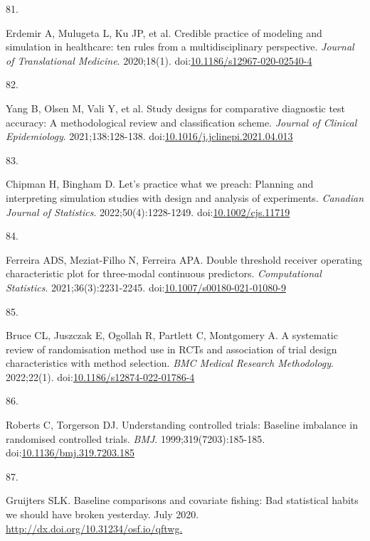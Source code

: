 \documentclass[
]{book}
\newlength{\cslhangindent}
\newlength{\csllabelwidth}
\newlength{\cslentryspacingunit} %
\newenvironment{CSLReferences}[2] %
 {%
  \setlength{\parindent}{0pt}
  \ifodd #1
  \let\oldpar\par
  \def\par{\hangindent=\cslhangindent\oldpar}
  \fi
  \setlength{\parskip}{#2\cslentryspacingunit}
 }%
 {}
\newcommand{\CSLLeftMargin}[1]{\parbox[t]{\csllabelwidth}{#1}}
\newcommand{\CSLRightInline}[1]{\parbox[t]{\linewidth - \csllabelwidth}{#1}\break}
\begin{document}
\begin{CSLReferences}{0}{0}
\leavevmode{}%
\CSLLeftMargin{81. }%
\CSLRightInline{Erdemir A, Mulugeta L, Ku JP, et al. Credible practice of modeling and simulation in healthcare: ten rules from a multidisciplinary perspective. \emph{Journal of Translational Medicine}. 2020;18(1). doi:\href{https://doi.org/10.1186/s12967-020-02540-4}{10.1186/s12967-020-02540-4}}

\leavevmode{}%
\CSLLeftMargin{82. }%
\CSLRightInline{Yang B, Olsen M, Vali Y, et al. Study designs for comparative diagnostic test accuracy: A methodological review and classification scheme. \emph{Journal of Clinical Epidemiology}. 2021;138:128-138. doi:\href{https://doi.org/10.1016/j.jclinepi.2021.04.013}{10.1016/j.jclinepi.2021.04.013}}

\leavevmode{}%
\CSLLeftMargin{83. }%
\CSLRightInline{Chipman H, Bingham D. Let's practice what we preach: Planning and interpreting simulation studies with design and analysis of experiments. \emph{Canadian Journal of Statistics}. 2022;50(4):1228-1249. doi:\href{https://doi.org/10.1002/cjs.11719}{10.1002/cjs.11719}}

\leavevmode{}%
\CSLLeftMargin{84. }%
\CSLRightInline{Ferreira ADS, Meziat-Filho N, Ferreira APA. Double threshold receiver operating characteristic plot for three-modal continuous predictors. \emph{Computational Statistics}. 2021;36(3):2231-2245. doi:\href{https://doi.org/10.1007/s00180-021-01080-9}{10.1007/s00180-021-01080-9}}

\leavevmode{}%
\CSLLeftMargin{85. }%
\CSLRightInline{Bruce CL, Juszczak E, Ogollah R, Partlett C, Montgomery A. A systematic review of randomisation method use in RCTs and association of trial design characteristics with method selection. \emph{BMC Medical Research Methodology}. 2022;22(1). doi:\href{https://doi.org/10.1186/s12874-022-01786-4}{10.1186/s12874-022-01786-4}}

\leavevmode{}%
\CSLLeftMargin{86. }%
\CSLRightInline{Roberts C, Torgerson DJ. Understanding controlled trials: Baseline imbalance in randomised controlled trials. \emph{BMJ}. 1999;319(7203):185-185. doi:\href{https://doi.org/10.1136/bmj.319.7203.185}{10.1136/bmj.319.7203.185}}

\leavevmode{}%
\CSLLeftMargin{87. }%
\CSLRightInline{Gruijters SLK. Baseline comparisons and covariate fishing: Bad statistical habits we should have broken yesterday. July 2020. \href{http://dx.doi.org/10.31234/osf.io/qftwg}{http://dx.doi.org/10.31234/osf.io/qftwg.}}


\end{CSLReferences}
\end{document}
